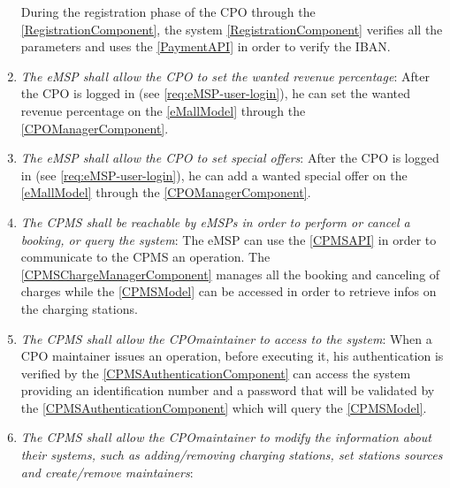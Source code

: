 \begin{enumerate}[label=\textbf{R\arabic*}]
          During the registration phase of the \ac{CPO} through the \ref{RegistrationComponent}, the system \ref{RegistrationComponent} verifies all the parameters and uses the \ref{PaymentAPI} in order to verify the \ac{IBAN}.
          \label{req:eMSP-correct-cpo-info}
    \item \textit{The \ac{eMSP} shall allow the \ac{CPO} to set the wanted revenue percentage}:
          After the \ac{CPO} is logged in (see \ref{req:eMSP-user-login}), he can set the wanted revenue percentage on the \ref{eMallModel} through the \ref{CPOManagerComponent}.
          \label{req:eMSP-set-revenue}
    \item \textit{The \ac{eMSP} shall allow the \ac{CPO} to set special offers}:
          After the \ac{CPO} is logged in (see \ref{req:eMSP-user-login}), he can add a wanted special offer on the \ref{eMallModel} through the \ref{CPOManagerComponent}.
          \label{req:eMSP-set-special-offers}
    \item \textit{The \ac{CPMS} shall be reachable by \acp{eMSP} in order to perform or cancel a booking, or query the system}:
          The \ac{eMSP} can use the \ref{CPMSAPI} in order to communicate to the \ac{CPMS} an operation. The \ref{CPMSChargeManagerComponent} manages all the booking and canceling of charges while the \ref{CPMSModel} can be accessed in order to retrieve infos on the charging stations.
          \label{req:CPMS-reachable}
    \item \textit{The \ac{CPMS} shall allow the \ac{CPO}maintainer to access to the system}:
          When a \ac{CPO} maintainer issues an operation, before executing it, his authentication is verified by the \ref{CPMSAuthenticationComponent} can access the system providing an identification number and a password that will be validated by the \ref{CPMSAuthenticationComponent} which will query the \ref{CPMSModel}.
          \label{req:CPMS-accessible}
    \item \textit{The \ac{CPMS} shall allow the \ac{CPO}maintainer to modify the information about their systems, such as adding/removing charging stations, set stations sources and create/remove maintainers}:

\end{enumerate}
